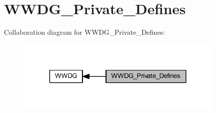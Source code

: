 \hypertarget{group___w_w_d_g___private___defines}{}\section{W\+W\+D\+G\+\_\+\+Private\+\_\+\+Defines}
\label{group___w_w_d_g___private___defines}
Collaboration diagram for W\+W\+D\+G\+\_\+\+Private\+\_\+\+Defines\+:
\nopagebreak
\begin{figure}[H]
\begin{center}
\leavevmode
\includegraphics[width=288pt]{group___w_w_d_g___private___defines}
\end{center}
\end{figure}
